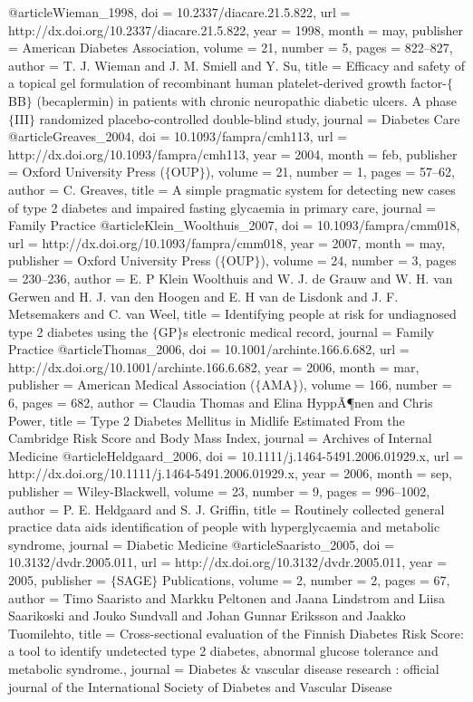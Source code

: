 @article{Wieman_1998,
	doi = {10.2337/diacare.21.5.822},
	url = {http://dx.doi.org/10.2337/diacare.21.5.822},
	year = 1998,
	month = {may},
	publisher = {American Diabetes Association},
	volume = {21},
	number = {5},
	pages = {822--827},
	author = {T. J. Wieman and J. M. Smiell and Y. Su},
	title = {Efficacy and safety of a topical gel formulation of recombinant human platelet-derived growth factor-$\lbrace$BB$\rbrace$ (becaplermin) in patients with chronic neuropathic diabetic ulcers. A phase $\lbrace$III$\rbrace$ randomized placebo-controlled double-blind study},
	journal = {Diabetes Care}
}
@article{Greaves_2004,
	doi = {10.1093/fampra/cmh113},
	url = {http://dx.doi.org/10.1093/fampra/cmh113},
	year = 2004,
	month = {feb},
	publisher = {Oxford University Press ($\lbrace$OUP$\rbrace$)},
	volume = {21},
	number = {1},
	pages = {57--62},
	author = {C. Greaves},
	title = {A simple pragmatic system for detecting new cases of type 2 diabetes and impaired fasting glycaemia in primary care},
	journal = {Family Practice}
}
@article{Klein_Woolthuis_2007,
	doi = {10.1093/fampra/cmm018},
	url = {http://dx.doi.org/10.1093/fampra/cmm018},
	year = 2007,
	month = {may},
	publisher = {Oxford University Press ($\lbrace$OUP$\rbrace$)},
	volume = {24},
	number = {3},
	pages = {230--236},
	author = {E. P Klein Woolthuis and W. J. de Grauw and W. H. van Gerwen and H. J. van den Hoogen and E. H van de Lisdonk and J. F. Metsemakers and C. van Weel},
	title = {Identifying people at risk for undiagnosed type 2 diabetes using the $\lbrace$GP$\rbrace${\textquotesingle}s electronic medical record},
	journal = {Family Practice}
}
@article{Thomas_2006,
	doi = {10.1001/archinte.166.6.682},
	url = {http://dx.doi.org/10.1001/archinte.166.6.682},
	year = 2006,
	month = {mar},
	publisher = {American Medical Association ($\lbrace$AMA$\rbrace$)},
	volume = {166},
	number = {6},
	pages = {682},
	author = {Claudia Thomas and Elina HyppÃ¶nen and Chris Power},
	title = {Type 2 Diabetes Mellitus in Midlife Estimated From the Cambridge Risk Score and Body Mass Index},
	journal = {Archives of Internal Medicine}
}
@article{Heldgaard_2006,
	doi = {10.1111/j.1464-5491.2006.01929.x},
	url = {http://dx.doi.org/10.1111/j.1464-5491.2006.01929.x},
	year = 2006,
	month = {sep},
	publisher = {Wiley-Blackwell},
	volume = {23},
	number = {9},
	pages = {996--1002},
	author = {P. E. Heldgaard and S. J. Griffin},
	title = {Routinely collected general practice data aids identification of people with hyperglycaemia and metabolic syndrome},
	journal = {Diabetic Medicine}
}
@article{Saaristo_2005,
	doi = {10.3132/dvdr.2005.011},
	url = {http://dx.doi.org/10.3132/dvdr.2005.011},
	year = 2005,
	publisher = {$\lbrace$SAGE$\rbrace$ Publications},
	volume = {2},
	number = {2},
	pages = {67},
	author = {Timo Saaristo and Markku Peltonen and Jaana Lindstrom and Liisa Saarikoski and Jouko Sundvall and Johan Gunnar Eriksson and Jaakko Tuomilehto},
	title = {Cross-sectional evaluation of the Finnish Diabetes Risk Score: a tool to identify undetected type 2 diabetes, abnormal glucose tolerance and metabolic syndrome.},
	journal = {Diabetes {\&} vascular disease research : official journal of the International Society of Diabetes and Vascular Disease}
}
